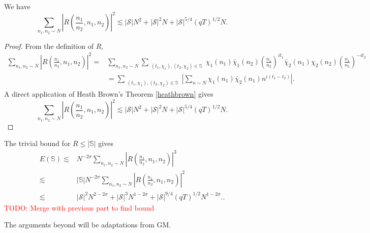 \begin{lemma}
    We have 
\[
        \sum_{n_1,n_2\sim N}\left|R\left(\frac{n_1}{n_2},n_1,n_2\right) \right|^2\lesssim |\mathcal{S}|N^2+ |\mathcal{S}|^2N + |\mathcal{S}|^{5/4}(qT)^{1/2}N.
    \]
\end{lemma}
\begin{proof}
    From the definition of $R$, \begin{align*}
        \sum_{n_1,n_2\sim N}\left|R\left(\frac{n_1}{n_2},n_1,n_2\right) \right|^2=& \sum_{n_1,n_2\sim N}\sum_{\substack{(t_1,\chi_1),(t_2,\chi_2)\in \mathbb{S}}}
        \chi_1(n_1)\bar{\chi}_1(n_2)\left(\frac{n_1}{n_2}\right)^{it_1}\bar{\chi}_2(n_1){\chi}_2(n_2)\left(\frac{n_1}{n_2}\right)^{-it_2}
        \\
        &=\sum_{\substack{(t_1,\chi_1),(t_2,\chi_2)\in \mathbb{S}}}\left|\sum_{n\sim N}
        \chi_1(n_1)\bar{\chi}_2(n_1)n^{i(t_1-t_2)}\right|.
    \end{align*}
    A direct application of Heath Brown's Theorem \ref{heathbrown} gives \[
        \sum_{n_1,n_2\sim N}\left|R\left(\frac{n_1}{n_2},n_1,n_2\right) \right|^2\lesssim |\mathcal{S}|N^2+ |\mathcal{S}|^2N + |\mathcal{S}|^{5/4}(qT)^{1/2}N.
    \]
\end{proof}
The trivial bound for $R\leq |\mathbb{S}|$ gives \begin{align*}
    E(\mathbb{S})\lesssim& N^{-2\sigma}\sum_{n_1,n_2\sim N}\left|R\left(\frac{n_1}{n_2},n_1,n_2\right) \right|^3\\
    \lesssim &|\mathbb{S}|N^{-2\sigma}\sum_{n_1,n_2\sim N}\left|R\left(\frac{n_1}{n_2},n_1,n_2\right) \right|^2\\
    \lesssim& |\mathcal{S}|^2N^{2-2\sigma}+ |\mathcal{S}|^3N^{1-2\sigma} + |\mathcal{S}|^{9/4}(qT)^{1/2}N^{{1-2\sigma}}..
\end{align*}
\textcolor{red}{TODO: Merge with previous part to find bound}

The arguments beyond will be adaptations from GM. 

